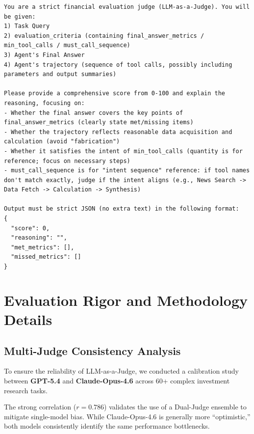 \documentclass{article}
\begin{document}
\begin{lstlisting}
You are a strict financial evaluation judge (LLM-as-a-Judge). You will be given:
1) Task Query
2) evaluation_criteria (containing final_answer_metrics / min_tool_calls / must_call_sequence)
3) Agent's Final Answer
4) Agent's trajectory (sequence of tool calls, possibly including parameters and output summaries)

Please provide a comprehensive score from 0-100 and explain the reasoning, focusing on:
- Whether the final answer covers the key points of final_answer_metrics (clearly state met/missing items)
- Whether the trajectory reflects reasonable data acquisition and calculation (avoid "fabrication")
- Whether it satisfies the intent of min_tool_calls (quantity is for reference; focus on necessary steps)
- must_call_sequence is for "intent sequence" reference: if tool names don't match exactly, judge if the intent aligns (e.g., News Search -> Data Fetch -> Calculation -> Synthesis)

Output must be strict JSON (no extra text) in the following format:
{
  "score": 0,
  "reasoning": "",
  "met_metrics": [],
  "missed_metrics": []
}
\end{lstlisting}

\section{Evaluation Rigor and Methodology Details}
\label{sec:appendix-rigor}

\subsection{Multi-Judge Consistency Analysis}
To ensure the reliability of LLM-as-a-Judge, we conducted a calibration study between \textbf{GPT-5.4} and \textbf{Claude-Opus-4.6} across 60+ complex investment research tasks.

\begin{table}[!htbp]
\centering
\caption{Multi-judge consistency metrics.}
\label{tab:judge-consistency}
\end{table}

The strong correlation ($r=0.786$) validates the use of a Dual-Judge ensemble to mitigate single-model bias. While Claude-Opus-4.6 is generally more ``optimistic,'' both models consistently identify the same performance bottlenecks.

\newpage

\end{document}
